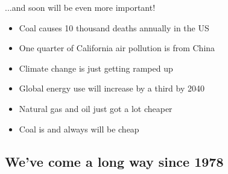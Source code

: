 \documentclass{beamer}
\begin{document}
    \begin{frame}{...and soon will be even more important!}

        \begin{itemize}

            \item Coal causes 10 thousand deaths annually in the US
            \pause
            \item One quarter of California air pollution is from China
            \pause
            \item Climate change is just getting ramped up
            \pause

            \vspace{2em}

            \item Global energy use will increase by a third by 2040
            \pause
            \item Natural gas and oil just got a lot cheaper
            \pause
            \item Coal is and always will be cheap

        \end{itemize}

    \end{frame}

\subsection{We've come a long way since 1978}
\end{document}
